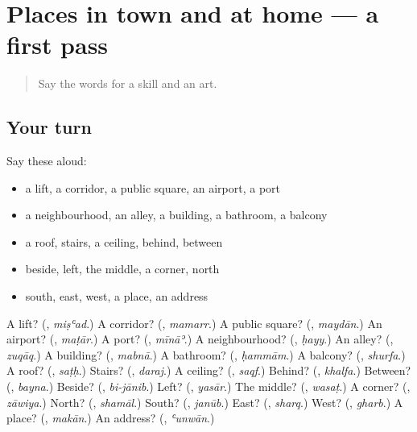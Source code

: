 \section[(dialogue)]{Places in town and at home — a first pass}

\label{lesson:AR-R109-first-pass-places-in-town-and-at-home}



\begin{quote}
Say the words for a skill and an art.
\end{quote}

\subsection*{Your turn}
Say these aloud:

\begin{itemize}
\raggedright
  \item a lift, a corridor, a public square, an airport, a port
  \item a neighbourhood, an alley, a building, a bathroom, a balcony
  \item a roof, stairs, a ceiling, behind, between
  \item beside, left, the middle, a corner, north
  \item south, east, west, a place, an address
\end{itemize}

\begin{tcolorbox}[breakable,colback=teal!4,colframe=teal!35!black,title={Before you move on}]
A lift? (\textbf{}, \emph{miṣʿad}.) A corridor? (\textbf{}, \emph{mamarr}.) A public square? (\textbf{}, \emph{maydān}.) An airport? (\textbf{}, \emph{maṭār}.) A port? (\textbf{}, \emph{mīnāʾ}.) A neighbourhood? (\textbf{}, \emph{ḥayy}.) An alley? (\textbf{}, \emph{zuqāq}.) A building? (\textbf{}, \emph{mabnā}.) A bathroom? (\textbf{}, \emph{ḥammām}.) A balcony? (\textbf{}, \emph{shurfa}.) A roof? (\textbf{}, \emph{saṭḥ}.) Stairs? (\textbf{}, \emph{daraj}.) A ceiling? (\textbf{}, \emph{saqf}.) Behind? (\textbf{}, \emph{khalfa}.) Between? (\textbf{}, \emph{bayna}.) Beside? (\textbf{}, \emph{bi-jānib}.) Left? (\textbf{}, \emph{yasār}.) The middle? (\textbf{}, \emph{wasaṭ}.) A corner? (\textbf{}, \emph{zāwiya}.) North? (\textbf{}, \emph{shamāl}.) South? (\textbf{}, \emph{janūb}.) East? (\textbf{}, \emph{sharq}.) West? (\textbf{}, \emph{gharb}.) A place? (\textbf{}, \emph{makān}.) An address? (\textbf{}, \emph{ʿunwān}.)
\end{tcolorbox}
